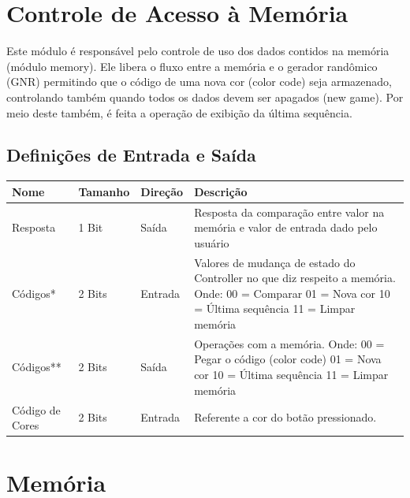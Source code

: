 \documentclass{report}
\begin{document}
    
   
  \section{Controle de Acesso à Memória}
  
  Este módulo é responsável pelo controle de uso dos dados contidos na memória (módulo memory). Ele libera o fluxo entre a memória e o gerador randômico (GNR) permitindo que o código de uma nova cor (color code) seja armazenado, controlando também quando todos os dados devem ser apagados (new game). Por meio deste também, é feita a operação de exibição da última sequência.
  
    \subsection{Definições de Entrada e Saída}
     \begin{table}[H]
       \centering
        \begin{tabular}[pos]{|m{2cm} |m{2cm}| m{3cm} | m{5cm}|} 
         \hline
          \cellcolor[gray]{0.9}
           \textbf{Nome} & \cellcolor[gray]{0.9} \textbf{Tamanho}  &\cellcolor[gray]{0.9}\textbf{Direção} & \cellcolor[gray]{0.9}\textbf{Descrição}\\ \hline
                Resposta & 1 Bit & Saída & Resposta da comparação entre valor na memória e valor de entrada dado pelo usuário\\ \hline
                Códigos* & 2 Bits & Entrada & Valores de mudança de estado do Controller no que diz respeito a memória. 
Onde: 00 = Comparar
01 = Nova cor
10 = Última sequência
11 = Limpar memória
  \\ \hline
                Códigos** & 2 Bits & Saída & Operações com a memória. 
Onde: 00 = Pegar o código (color code)
01 = Nova cor
10 = Última sequência
11 = Limpar memória
 \\ \hline
                Código de Cores & 2 Bits & Entrada & Referente a cor do botão pressionado. \\ \hline
        \end{tabular}
       \end{table}
    
    
  \section{Memória}
  
\end{document}
